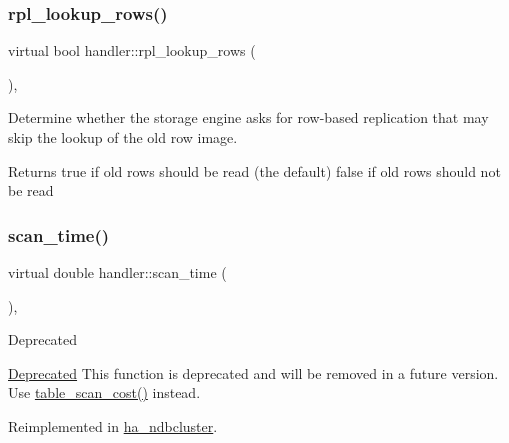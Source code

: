 \subsubsection{\texorpdfstring{rpl\+\_\+lookup\+\_\+rows()}{rpl\_lookup\_rows()}}
{\footnotesize\ttfamily virtual bool handler\+::rpl\+\_\+lookup\+\_\+rows (\begin{DoxyParamCaption}{ }\end{DoxyParamCaption})\hspace{0.3cm}{\ttfamily [inline]}, {\ttfamily [virtual]}}

Determine whether the storage engine asks for row-\/based replication that may skip the lookup of the old row image.

\begin{DoxyReturn}{Returns}
true if old rows should be read (the default) false if old rows should not be read 
\end{DoxyReturn}
\mbox{\label{classhandler_a65f8e5188e2bd9636a564bbc0c3fef86}} 
\subsubsection{\texorpdfstring{scan\+\_\+time()}{scan\_time()}}
{\footnotesize\ttfamily virtual double handler\+::scan\+\_\+time (\begin{DoxyParamCaption}{ }\end{DoxyParamCaption})\hspace{0.3cm}{\ttfamily [inline]}, {\ttfamily [virtual]}}

\begin{DoxyRefDesc}{Deprecated}
\item[\mbox{\hyperlink{deprecated__deprecated000001}{Deprecated}}]This function is deprecated and will be removed in a future version. Use \mbox{\hyperlink{classhandler_a5e9380355a7eea5386ef061f36479258}{table\+\_\+scan\+\_\+cost()}} instead. \end{DoxyRefDesc}


Reimplemented in \mbox{\hyperlink{classha__ndbcluster_a21574780af8b6cdc0bbcf8dc5ccb5164}{ha\+\_\+ndbcluster}}.

\mbox{\label{classhandler_a4b7dfb95a0da2e828ac018aa2b4abe3a}} 
